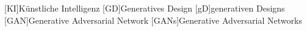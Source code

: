 \begin{acronym}
  [KI]{Künstliche Intelligenz}
  [GD]{Generatives Design }
  [gD]{generativen Designs}
  [GAN]{Generative Adversarial Network}
  [GANs]{Generative Adversarial Networks}
\end{acronym}